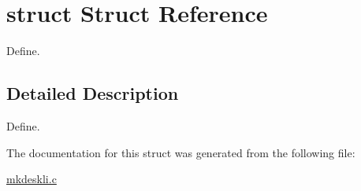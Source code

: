 \hypertarget{structstruct}{\section{struct Struct Reference}
\label{structstruct}
}


Define.  




\subsection{Detailed Description}
Define. 

The documentation for this struct was generated from the following file\-:\begin{DoxyCompactItemize}
\item 
\hyperlink{mkdeskli_8c}{mkdeskli.\-c}\end{DoxyCompactItemize}
